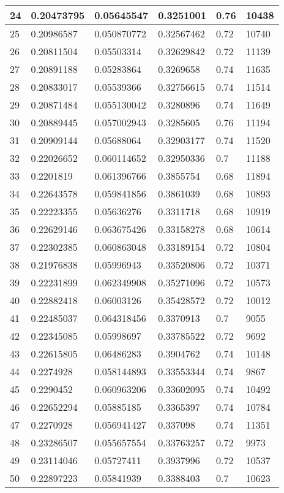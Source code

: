 \begin{longtable}{|l|l|l|l|l|l|}
24 & 0.20473795 & 0.05645547 & 0.3251001 & 0.76 & 10438 \\ \hline 
25 & 0.20986587 & 0.050870772 & 0.32567462 & 0.72 & 10740 \\ \hline 
26 & 0.20811504 & 0.05503314 & 0.32629842 & 0.72 & 11139 \\ \hline 
27 & 0.20891188 & 0.05283864 & 0.3269658 & 0.74 & 11635 \\ \hline 
28 & 0.20833017 & 0.05539366 & 0.32756615 & 0.74 & 11514 \\ \hline 
29 & 0.20871484 & 0.055130042 & 0.3280896 & 0.74 & 11649 \\ \hline 
30 & 0.20889445 & 0.057002943 & 0.3285605 & 0.76 & 11194 \\ \hline 
31 & 0.20909144 & 0.05688064 & 0.32903177 & 0.74 & 11520 \\ \hline 
32 & 0.22026652 & 0.060114652 & 0.32950336 & 0.7 & 11188 \\ \hline 
33 & 0.2201819 & 0.061396766 & 0.3855754 & 0.68 & 11894 \\ \hline 
34 & 0.22643578 & 0.059841856 & 0.3861039 & 0.68 & 10893 \\ \hline 
35 & 0.22223355 & 0.05636276 & 0.3311718 & 0.68 & 10919 \\ \hline 
36 & 0.22629146 & 0.063675426 & 0.33158278 & 0.68 & 10614 \\ \hline 
37 & 0.22302385 & 0.060863048 & 0.33189154 & 0.72 & 10804 \\ \hline 
38 & 0.21976838 & 0.05996943 & 0.33520806 & 0.72 & 10371 \\ \hline 
39 & 0.22231899 & 0.062349908 & 0.35271096 & 0.72 & 10573 \\ \hline 
40 & 0.22882418 & 0.06003126 & 0.35428572 & 0.72 & 10012 \\ \hline 
41 & 0.22485037 & 0.064318456 & 0.3370913 & 0.7 & 9055 \\ \hline 
42 & 0.22345085 & 0.05998697 & 0.33785522 & 0.72 & 9692 \\ \hline 
43 & 0.22615805 & 0.06486283 & 0.3904762 & 0.74 & 10148 \\ \hline 
44 & 0.2274928 & 0.058144893 & 0.33553344 & 0.74 & 9867 \\ \hline 
45 & 0.2290452 & 0.060963206 & 0.33602095 & 0.74 & 10492 \\ \hline 
46 & 0.22652294 & 0.05885185 & 0.3365397 & 0.74 & 10784 \\ \hline 
47 & 0.2270928 & 0.056941427 & 0.337098 & 0.74 & 11351 \\ \hline 
48 & 0.23286507 & 0.055657554 & 0.33763257 & 0.72 & 9973 \\ \hline 
49 & 0.23114046 & 0.05727411 & 0.3937996 & 0.72 & 10537 \\ \hline 
50 & 0.22897223 & 0.05841939 & 0.3388403 & 0.7 & 10623 \\ \hline 
\end{longtable}